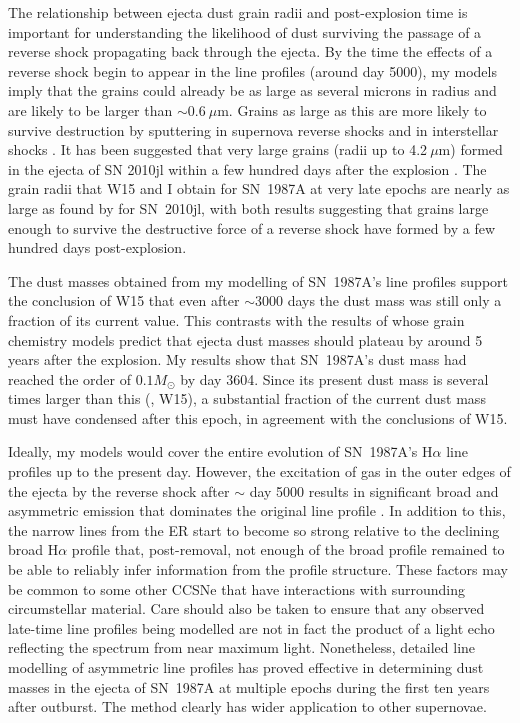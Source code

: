 The relationship between ejecta dust grain radii and post-explosion 
time is important for understanding the likelihood of dust surviving the 
passage of a reverse shock propagating back through the ejecta. By the 
time the effects of a reverse shock begin to appear in the line profiles 
(around day 5000), my models imply that the grains could already be as 
large as several microns in radius and are likely to be larger than $\sim 
0.6~\mu$m. Grains as large as this are more likely to survive destruction 
by sputtering in supernova reverse shocks and in interstellar shocks 
\citep{Silvia2010, Silvia2012, Slavin2015}.
It has been suggested that very large grains (radii up to 4.2$~\mu$m) 
formed in the ejecta of SN 2010jl within a few hundred days after the 
explosion \cite{Gall2014}. The grain radii that W15 and I obtain 
for SN~1987A at very late epochs are nearly as large as found by 
\citet{Gall2014} for SN~2010jl, with both results suggesting that grains 
large enough to survive the destructive force of a reverse shock have 
formed by a few hundred days post-explosion. 

The dust masses obtained from my modelling of SN~1987A's line profiles 
support the conclusion of W15 that even after $\sim$3000 days the dust 
mass was still only a fraction of its current value. This contrasts with 
the results of \citet{Sarangi2015} whose grain chemistry models predict 
that ejecta dust masses should plateau by around 5 years after the 
explosion. My results show that SN~1987A's dust mass had reached 
the order of $0.1M_{\odot}$ by day 3604.  Since its present dust mass is 
several times larger than this (\citet{Matsuura2015}, W15), a 
substantial fraction of the current dust mass must have condensed after 
this epoch, in agreement with the conclusions of W15.

Ideally, my models would cover the entire evolution of SN~1987A's 
H$\alpha$ line profiles up to the present day.  However, the excitation of 
gas in the outer edges of the ejecta by the reverse shock after $\sim$ day 
5000 results in significant broad and asymmetric emission that 
dominates the original line profile \citep{Fransson2013}.  In addition to 
this, the narrow lines from the ER start to become so 
strong relative to the declining broad H$\alpha$ profile that, 
post-removal, not enough of the broad profile remained to be 
able to reliably infer information from the profile structure. These 
factors may be 
common to some other CCSNe that have interactions with surrounding 
circumstellar material. Care should also be taken to ensure that any 
observed late-time line profiles being modelled are not in fact the 
product of a light echo reflecting the spectrum from near maximum light. 
Nonetheless, detailed line modelling of asymmetric line profiles has 
proved effective in determining dust masses in the ejecta of SN~1987A at 
multiple epochs during the first ten years after outburst. The method 
clearly has wider application to other supernovae.


